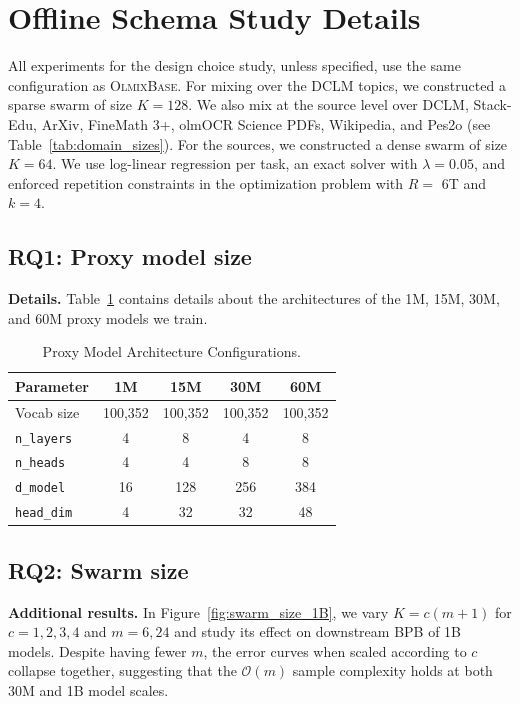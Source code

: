 \documentclass[table]{ai2style/ai2}
\newcommand{\base}[0]{\textsc{OlmixBase}\xspace}
\begin{document}
\clearpage

\appendix

\section{Offline Schema Study Details}\label{supp:study_details}

All experiments for the design choice study, unless specified, use the same configuration as \base. For mixing over the DCLM topics, we constructed a sparse swarm of size $K = 128$.
We also mix at the source level over DCLM, Stack-Edu, ArXiv, FineMath 3+, olmOCR Science PDFs, Wikipedia, and Pes2o (see Table~\ref{tab:domain_sizes}). For the sources, we constructed a dense swarm of size $K = 64$. We use log-linear regression per task, an exact solver with $\lambda = 0.05$, and enforced repetition constraints in the optimization problem with $R =$ 6T and $k = 4$.

\subsection{RQ1: Proxy model size} 

\textbf{Details.} Table~\ref{tab:model_architectures} contains details about the architectures of the 1M, 15M, 30M, and 60M proxy models we train. 

\begin{table}[htb]
\centering
\caption{Proxy Model Architecture Configurations.}
\label{tab:model_architectures}
\begin{tabular}{lcccc}
\toprule
\textbf{Parameter} & \textbf{1M} & \textbf{15M} & \textbf{30M} & \textbf{60M} \\
\midrule
Vocab size & 100,352 & 100,352 & 100,352 & 100,352 \\
\texttt{n\_layers} & 4 & 8 & 4 & 8 \\
\texttt{n\_heads} & 4 & 4 & 8 & 8 \\
\texttt{d\_model} & 16 & 128 & 256 & 384 \\
\texttt{head\_dim} & 4 & 32 & 32 & 48 \\
\bottomrule
\end{tabular}
\end{table}

\subsection{RQ2: Swarm size} 

\textbf{Additional results.} In Figure~\ref{fig:swarm_size_1B}, we vary $K = c(m+1)$ for $c = 1, 2, 3, 4$ and $m=6, 24$ and study its effect on downstream BPB of 1B models. Despite having fewer $m$, the error curves when scaled according to $c$ collapse together, suggesting that the $\mathcal{O}(m)$ sample complexity holds at both 30M and 1B model scales. 
\end{document}
